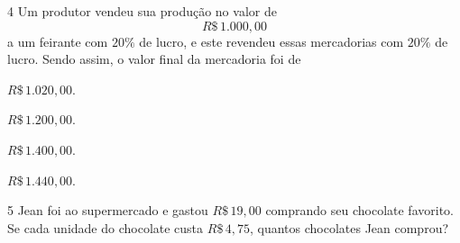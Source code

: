 
\num{4}  Um produtor vendeu sua produção no valor de $$R\$\,1.000,00$$ a um
feirante com $20\%$ de lucro, e este revendeu essas mercadorias com $20\%$
de lucro. Sendo assim, o valor final da mercadoria foi de

\begin{escolha}
\item $R\$\,1.020,00$.
\item $R\$\,1.200,00$.
\item $R\$\,1.400,00$.
\item $R\$\,1.440,00$.
\end{escolha}



\num{5}  Jean foi ao supermercado e gastou $R\$\,19,00$ comprando seu chocolate
favorito. Se cada unidade do chocolate custa $R\$\,4,75$, quantos
chocolates Jean comprou?

